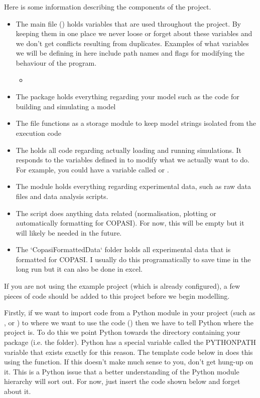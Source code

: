 \documentclass[../main]{subfiles}
\begin{document}
Here is some information describing the components of the project.

\begin{itemize}
\item The main  file () holds variables that
are used throughout the project. By keeping them in one place we never loose or forget about these
variables and we don't get conflicts resulting from duplicates. Examples of what variables we
will be defining in here include path names and flags for modifying the behaviour of the
program.
\begin{itemize}
\item {}
\end{itemize}
\item The  package holds everything regarding your model such as the code for building and simulating a model
\item The  file functions as a storage module to keep model strings isolated from the execution code
\item The  holds all code regarding actually loading and running simulations. It responds
to the variables defined in  to modify what we actually want to do. For example, you could have
a variable called  or .
\item The  module holds everything regarding experimental data, such as raw data
files and data analysis scripts.
\item The  script does anything data
related (normalisation, plotting or automatically formatting for COPASI). For now, this will be empty but it will likely
be needed in the future.
\item The `CopasiFormattedData` folder holds all experimental data that is formatted for COPASI.
I usually do this programatically to save time in the long run but it can also be done in excel.
\end{itemize}

If you are not using the example project (which is already configured), a few pieces of code should
be added to this project before we begin modelling.

Firstly, if we want to import code from a Python module in your project (such as ,
 or ) to where we want to use the code ()
then we have to tell Python where the project is. To do this we point Python towards the directory containing
your package (i.e. the  folder). Python has a special variable called the
PYTHONPATH variable that exists exactly for this reason. The template code below in 
does this using the  function. If this doesn't make much sense to you,
don't get hung-up on it. This is a Python issue that a better understanding of the Python
module hierarchy will sort out. For now, just insert the code shown  below and forget about it.
\end{document}

